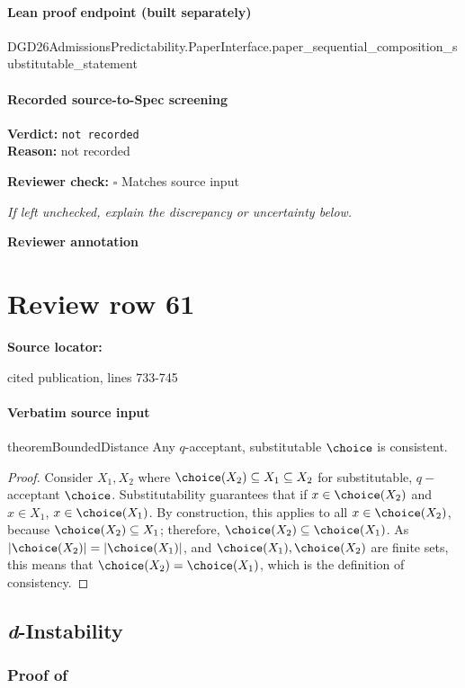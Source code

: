 \documentclass[10pt]{article}
\newcommand{\reviewerbox}{%
  \par\noindent\fbox{\parbox{0.96\linewidth}{\rule{0pt}{0.38in}}}\par
}
\newcommand{\reviewmatch}[1]{%
  \par\noindent\textbf{Reviewer check:} $\square$\; #1\par
  \noindent\emph{If left unchecked, explain the discrepancy or uncertainty below.}\par
}
\begin{document}
\paragraph{Lean proof endpoint (built separately)}\begin{ReviewVerbatim}
DGD26AdmissionsPredictability.PaperInterface.paper_sequential_composition_substitutable_statement
\end{ReviewVerbatim}

\paragraph{Recorded source-to-Spec screening}
\textbf{Verdict:} \texttt{not recorded}
\\
\textbf{Reason:} not recorded
\reviewmatch{Matches source input}
\noindent\textbf{Reviewer annotation}\par
\reviewerbox
\clearpage
\hypertarget{source-claim-b564e283fe9ce18d}{}
\section*{Review row 61}
\textbf{Source locator:} {\footnotesize\raggedright cited publication, lines 733-\allowbreak{}745\par}
\paragraph{Verbatim source input}
\begin{ReviewVerbatim}
\begin{restatable}{theorem}{BoundedDistance}
\label{thm:sub-accept-consistent}
Any $q$-acceptant, substitutable $\choice$ is consistent.
\end{restatable}

\begin{proof}
Consider $X_1, X_2$ where $\choice(X_2) \subseteq X_1 \subseteq X_2$ for substitutable, $q-$acceptant $\choice$. Substitutability guarantees that if $x \in \choice(X_2)$ and $x \in X_1$, $x \in \choice(X_1)$. By construction, this applies to all $x \in \choice(X_2)$, because $\choice(X_2) \subseteq X_1$; therefore, $\choice(X_2) \subseteq \choice(X_1)$. As $|\choice(X_2)| = |\choice(X_1)|$, and $\choice(X_1),\choice(X_2)$ are finite sets, this means that $\choice(X_2) = \choice(X_1)$, which is the definition of consistency.
\end{proof}

\subsection{\textit{d}-Instability} \label{sec:d-unstable-appendix}

\subsubsection{Proof of } \label{sec:calc-proof}
\end{ReviewVerbatim}
\end{document}
